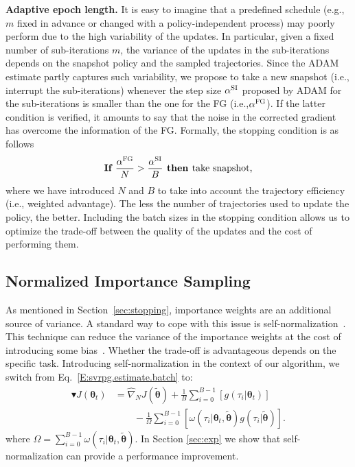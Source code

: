 \documentclass{article}
\makeatletter
\theoremstyle{remark}
\theoremstyle{definition}
\DeclareRobustCommand{\eg}{e.g.,\@\xspace}
\DeclareRobustCommand{\ie}{i.e.,\@\xspace}
\newcommand{\vtheta}{\boldsymbol{\theta}}
\newcommand{\wt}[1]{\widetilde{#1}}
\newcommand{\wh}[1]{\widehat{#1}}
\makeatother
\begin{document}
\textbf{Adaptive epoch length.}
It is easy to imagine that a predefined schedule (\eg $m$ fixed in advance or changed with a policy-independent process) may poorly perform due to the high variability of the updates.
In particular, given a fixed number of sub-iterations $m$, the variance of the updates in the sub-iterations depends on the snapshot policy and the sampled trajectories.
Since the ADAM estimate partly captures such variability,  we propose to take a new snapshot (\ie interrupt the sub-iterations) whenever the step size $\alpha^{\textsc{SI}}$ proposed by ADAM for the sub-iterations is smaller than the one for the FG (\ie $\alpha^{\textsc{FG}}$).
If the latter condition is verified, it amounts to say that the noise in the corrected gradient has overcome the information of the FG.
Formally, the stopping condition is as follows
\[
        \textbf{If }        \frac{\alpha^{\textsc{FG}}}{N} > \frac{\alpha^{\textsc{SI}}}{B} \textbf{ then } \text{take snapshot,}
\]
where we have introduced $N$ and $B$ to take into account the trajectory efficiency (\ie weighted advantage).
The less the number of trajectories used to update the policy, the better.
Including the batch sizes in the stopping condition allows us to optimize the trade-off between the quality of the updates and the cost of performing them.

\vspace{-0.05in}
\subsection{Normalized Importance Sampling}\label{sec:prac}
\vspace{-0.05in}
As mentioned in Section~\ref{sec:stopping}, importance weights are an additional source of variance. A standard way to cope with this issue is self-normalization~\citep[\eg][]{precup2000eligibility,owenmcbook}.
This technique can reduce the variance of the importance weights at the cost of introducing some bias~\citep[][Chapter 9]{owenmcbook}.
Whether the trade-off is advantageous depends on the specific task.  
Introducing self-normalization in the context of our algorithm, we switch from Eq.~\eqref{E:svrpg.estimate.batch} to:
\begin{align*}
        \blacktriangledown J(\vtheta_{t}) &= \wh{\nabla}_N J(\wt{\vtheta}) + \frac{1}{B} \sum_{i=0}^{B-1} \left[g(\tau_i|\vtheta_t)\right]\\ 
                                          &\qquad{} - \frac{1}{\Omega} \sum_{i=0}^{B-1} \left[ \omega(\tau_i|\vtheta_t, \wt{\vtheta}) g(\tau_i|\wt{\vtheta})
\right].
\end{align*}
where $\Omega = \sum_{i=0}^{B-1}\omega(\tau_i|\vtheta_t, \wt{\vtheta})$.
In Section \ref{sec:exp} we show that self-normalization can provide a performance improvement.
\end{document}
